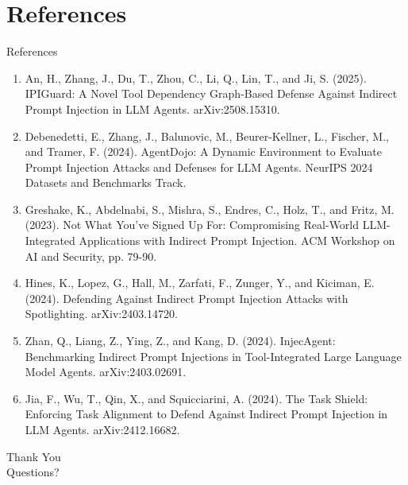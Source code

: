\documentclass[10pt]{beamer}
\begin{document}
\section{References}
\begin{frame}[allowframebreaks]{References}
  \footnotesize
  \begin{enumerate}
    \item An, H., Zhang, J., Du, T., Zhou, C., Li, Q., Lin, T., and Ji, S. (2025). IPIGuard: A Novel Tool Dependency Graph-Based Defense Against Indirect Prompt Injection in LLM Agents. arXiv:2508.15310.
    \item Debenedetti, E., Zhang, J., Balunovic, M., Beurer-Kellner, L., Fischer, M., and Tramer, F. (2024). AgentDojo: A Dynamic Environment to Evaluate Prompt Injection Attacks and Defenses for LLM Agents. NeurIPS 2024 Datasets and Benchmarks Track.
    \item Greshake, K., Abdelnabi, S., Mishra, S., Endres, C., Holz, T., and Fritz, M. (2023). Not What You've Signed Up For: Compromising Real-World LLM-Integrated Applications with Indirect Prompt Injection. ACM Workshop on AI and Security, pp. 79-90.
    \item Hines, K., Lopez, G., Hall, M., Zarfati, F., Zunger, Y., and Kiciman, E. (2024). Defending Against Indirect Prompt Injection Attacks with Spotlighting. arXiv:2403.14720.
    \item Zhan, Q., Liang, Z., Ying, Z., and Kang, D. (2024). InjecAgent: Benchmarking Indirect Prompt Injections in Tool-Integrated Large Language Model Agents. arXiv:2403.02691.
    \item Jia, F., Wu, T., Qin, X., and Squicciarini, A. (2024). The Task Shield: Enforcing Task Alignment to Defend Against Indirect Prompt Injection in LLM Agents. arXiv:2412.16682.
  \end{enumerate}
\end{frame}
\begin{frame}[plain]
  \begin{center}
    {\Huge Thank You}\\[1em]
    {\large Questions?}
  \end{center}
\end{frame}
\end{document}
